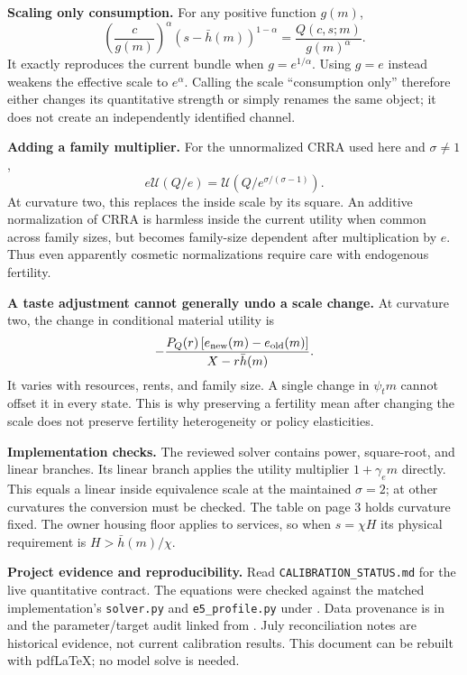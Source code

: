 \documentclass[11pt,letterpaper]{article}
\newcommand{\U}{\mathcal U}
\newcommand{\hh}{\bar h}
\begin{document}
\textbf{Scaling only consumption.} For any positive function $g(m)$,
\[
\left(\frac{c}{g(m)}\right)^\alpha(s-\hh(m))^{1-\alpha}
=\frac{Q(c,s;m)}{g(m)^\alpha}.
\]
It exactly reproduces the current bundle when $g=e^{1/\alpha}$. Using $g=e$ instead weakens the effective scale to $e^\alpha$. Calling the scale ``consumption only'' therefore either changes its quantitative strength or simply renames the same object; it does not create an independently identified channel.

\textbf{Adding a family multiplier.} For the unnormalized CRRA used here and $\sigma\ne1$,
\[
e\U(Q/e)=\U\!\left(Q/e^{\sigma/(\sigma-1)}\right).
\]
At curvature two, this replaces the inside scale by its square. An additive normalization of CRRA is harmless inside the current utility when common across family sizes, but becomes family-size dependent after multiplication by $e$. Thus even apparently cosmetic normalizations require care with endogenous fertility.

\textbf{A taste adjustment cannot generally undo a scale change.} At curvature two, the change in conditional material utility is
\[
-\frac{P_Q(r)\,[e_{\rm new}(m)-e_{\rm old}(m)]}{X-r\hh(m)}.
\]
It varies with resources, rents, and family size. A single change in $\psi_t m$ cannot offset it in every state. This is why preserving a fertility mean after changing the scale does not preserve fertility heterogeneity or policy elasticities.

\textbf{Implementation checks.} The reviewed solver contains power, square-root, and linear branches. Its linear branch applies the utility multiplier $1+\gamma_e m$ directly. This equals a linear inside equivalence scale at the maintained $\sigma=2$; at other curvatures the conversion must be checked. The table on page 3 holds curvature fixed. The owner housing floor applies to services, so when $s=\chi H$ its physical requirement is $H>\hh(m)/\chi$.

\small
\textbf{Project evidence and reproducibility.} Read \texttt{CALIBRATION\_STATUS.md} for the live quantitative contract. The equations were checked against the matched implementation's \texttt{solver.py} and \texttt{e5\_profile.py} under . Data provenance is in  and the parameter/target audit linked from . July reconciliation notes are historical evidence, not current calibration results. This document can be rebuilt with pdfLaTeX; no model solve is needed.
\end{document}
